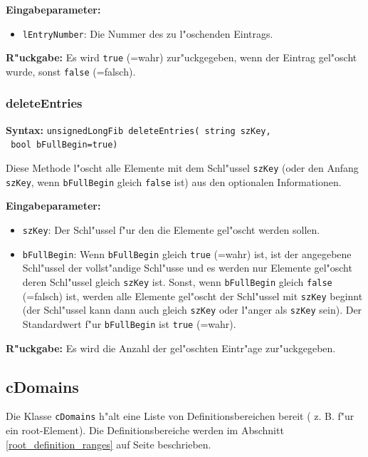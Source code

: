 \bigskip\noindent
\textbf{Eingabeparameter:}
\begin{itemize}
 \item \verb|lEntryNumber|: Die Nummer des zu l"oschenden Eintrags.
\end{itemize}

\bigskip\noindent
\textbf{R"uckgabe:} Es wird \verb|true| (=wahr) zur"uckgegeben, wenn der Eintrag gel"oscht wurde, sonst \verb|false| (=falsch).


\subsubsection{deleteEntries}

\textbf{Syntax:} \verb|unsignedLongFib deleteEntries( string szKey,| \\\verb| bool bFullBegin=true)|

\bigskip\noindent
Diese Methode l"oscht alle Elemente mit dem Schl"ussel \verb|szKey| (oder den Anfang \verb|szKey|, wenn \verb|bFullBegin| gleich \verb|false| ist) aus den optionalen Informationen.

\bigskip\noindent
\textbf{Eingabeparameter:}
\begin{itemize}
 \item \verb|szKey|: Der Schl"ussel f"ur den die Elemente gel"oscht werden sollen.
 \item \verb|bFullBegin|: Wenn \verb|bFullBegin| gleich \verb|true| (=wahr) ist, ist der angegebene Schl"ussel der vollst"andige Schl"usse und es werden nur Elemente gel"oscht deren Schl"ussel gleich \verb|szKey| ist. Sonst, wenn \verb|bFullBegin| gleich \verb|false| (=falsch) ist, werden alle Elemente gel"oscht der Schl"ussel mit \verb|szKey| beginnt (der Schl"ussel kann dann auch gleich \verb|szKey| oder l"anger als \verb|szKey| sein). Der Standardwert f"ur \verb|bFullBegin| ist \verb|true| (=wahr).
\end{itemize}

\bigskip\noindent
\textbf{R"uckgabe:} Es wird die Anzahl der gel"oschten Eintr"age zur"uckgegeben.



\subsection{cDomains}

Die Klasse \verb|cDomains| h"alt eine Liste von Definitionsbereichen bereit ( z. B. f"ur ein root-Element).
Die Definitionsbereiche werden im Abschnitt \ref{root_definition_ranges} auf Seite \pageref{root_definition_ranges} beschrieben.

